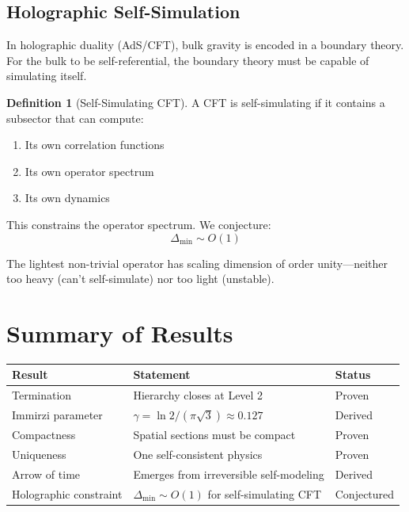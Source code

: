 \documentclass[11pt,a4paper]{article}
\theoremstyle{definition}
\newtheorem{definition}[theorem]{Definition}
\theoremstyle{remark}
\begin{document}
\subsection{Holographic Self-Simulation}

In holographic duality (AdS/CFT), bulk gravity is encoded in a boundary theory. For the bulk to be self-referential, the boundary theory must be capable of simulating itself.

\begin{definition}[Self-Simulating CFT]
A CFT is self-simulating if it contains a subsector that can compute:
\begin{enumerate}
    \item[(i)] Its own correlation functions
    \item[(ii)] Its own operator spectrum
    \item[(iii)] Its own dynamics
\end{enumerate}
\end{definition}

This constrains the operator spectrum. We conjecture:
\[
\Delta_{\min} \sim O(1)
\]

The lightest non-trivial operator has scaling dimension of order unity---neither too heavy (can't self-simulate) nor too light (unstable).

\section{Summary of Results}

\begin{center}
\begin{tabular}{lll}
\toprule
\textbf{Result} & \textbf{Statement} & \textbf{Status} \\
\midrule
Termination & Hierarchy closes at Level 2 & Proven \\
Immirzi parameter & $\gamma = \ln 2/(\pi\sqrt{3}) \approx 0.127$ & Derived \\
Compactness & Spatial sections must be compact & Proven \\
Uniqueness & One self-consistent physics & Proven \\
Arrow of time & Emerges from irreversible self-modeling & Derived \\
Holographic constraint & $\Delta_{\min} \sim O(1)$ for self-simulating CFT & Conjectured \\
\bottomrule
\end{tabular}
\end{center}
\end{document}
